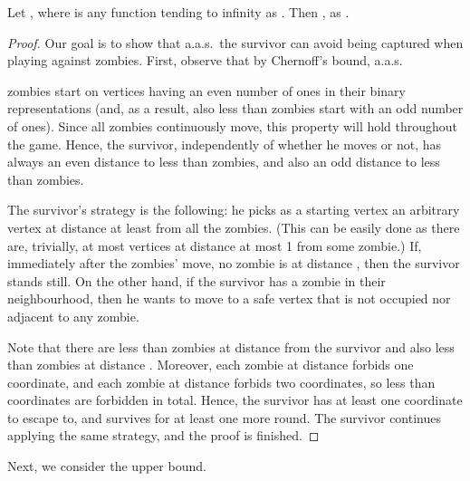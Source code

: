 \documentclass[12pt]{amsart}
\begin{document}
\begin{lemma}\label{lemm1}
Let , where  is any function tending to infinity as . Then , as .
\end{lemma}
\begin{proof}
Our goal is to show that a.a.s.\ the survivor can avoid being captured when playing against  zombies. First, observe that by Chernoff's bound, a.a.s.\

zombies start on vertices having an even number of ones in their binary representations (and, as a result, also less than  zombies start with an odd number of ones). Since all zombies
continuously move, this property will hold throughout the game. Hence, the survivor, independently of whether he moves or not, has always an even distance to less than  zombies, and also an odd
distance to less than  zombies.

The survivor's strategy is the following: he picks as a starting vertex an arbitrary vertex at distance at least  from all the zombies. (This can be easily done as there are, trivially, at most
 vertices at distance at most 1 from some zombie.) If, immediately after the zombies' move, no zombie is at distance , then the survivor stands still. On the other hand, if the
survivor has a zombie in their neighbourhood, then he wants to move to a safe vertex that is not occupied nor adjacent to any zombie.

Note that there are less than  zombies at distance  from the survivor and also less than  zombies at distance . Moreover, each zombie at distance  forbids one coordinate, and each zombie at distance  forbids two coordinates, so less than  coordinates are forbidden in total. Hence, the survivor has at
least one coordinate to escape to, and survives for at least one more round. The survivor continues applying the same strategy, and the proof is finished.
\end{proof}

Next, we consider the upper bound.
\end{document}
